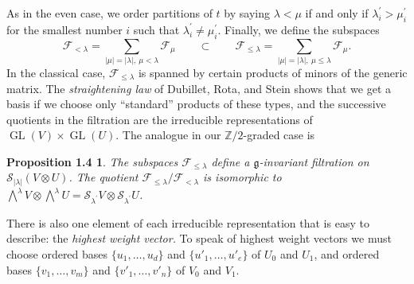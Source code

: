 \documentclass{tran-l}
\theoremstyle{plain}
\newtheorem*{theorem6}{Proposition 1.4}
\theoremstyle{remark}
\theoremstyle{definition}
\newcommand{\g}{{\mathfrak g}}
\newcommand{\myS}{{\mathcal S}}
\newcommand{\F}{{\mathcal F}}
\newcommand{\ZZ}{\mathbb {Z}}
\begin{document}
As in the even case, we order partitions of $t$ by saying $\lambda < \mu $ if
and only if $\lambda ^{\prime }_{i}
>\mu ^{\prime }_{i}$ for the smallest number $i$ 
such that $\lambda ^{\prime }_{i}
\ne \mu ^{\prime }_{i}$.
Finally, we define the subspaces
\begin{equation*}\F _{<\lambda }=\sum _{|\mu |=|\lambda |,\ \mu <\lambda }\F _{\mu }\qquad \subset \qquad \F _{\le \lambda }=\sum _{|\mu |=|\lambda |,\ \mu \le \lambda } \F _{\mu }.
\end{equation*}
In the classical case, $\F _{\leq \lambda }$ is spanned by certain products of
minors of the generic matrix. The {\em straightening law\/} of
Dubillet, Rota, and Stein
\cite{DRS} shows that we get a basis if we choose only ``standard'' products of
these
types, and the successive quotients in the filtration
are the irreducible representations of $\operatorname{GL}(V)\times \operatorname{GL}(U)$.
The analogue
in our $\ZZ /2$-graded case is

\begin{theorem6} The subspaces $\F _{\le \lambda }$ define a
$\g $-invariant filtration on
$\myS _{|\lambda |}(V\otimes U)$. The quotient $\F _{\le \lambda }/ \F _{<\lambda }$ is
isomorphic to $\bigwedge ^{\lambda }V\otimes \bigwedge ^{\lambda }U=\myS _{\lambda ^{\prime }} V\otimes \myS _{\lambda ^{\prime }} U$.\end{theorem6}


There is also one element of each irreducible representation that is easy to
describe: the {\em highest weight vector.} To speak of highest weight vectors
we must choose ordered bases $\{u_{1},\dots ,u_{d}\}$ and $\{u'_{1},\dots
,u'_{e}\}$ of $U_{0}$ and $U_{1}$, and ordered bases  $\{v_{1},\dots ,v_{m}\}$
and $\{v'_{1},\dots ,v'_{n}\}$ of $V_{0}$ and $V_{1}$.
\end{document}
